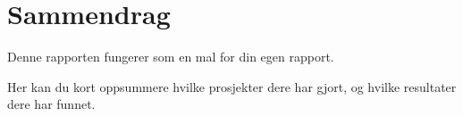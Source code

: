 \documentclass[main.tex]{subfiles}
\begin{document}
\chapter*{Sammendrag}\label{kap:sammendrag}

Denne rapporten fungerer som en mal for din egen rapport.

Her kan du kort oppsummere hvilke prosjekter dere har gjort, og
hvilke resultater dere har funnet.
\end{document}
